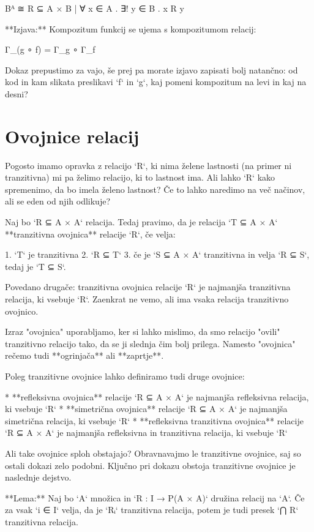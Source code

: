    Bᴬ ≅ { R ⊆ A × B | ∀ x ∈ A . ∃! y ∈ B . x R y }

**Izjava:** Kompozitum funkcij se ujema s kompozitumom relacij:

    Γ_(g ∘ f) = Γ_g ∘ Γ_f

Dokaz prepustimo za vajo, še prej pa morate izjavo zapisati bolj natančno: od
kod in kam slikata preslikavi `f` in `g`, kaj pomeni kompozitum na levi in kaj
na desni?

\section{Ovojnice relacij}

Pogosto imamo opravka z relacijo `R`, ki nima želene lastnosti (na primer ni
tranzitivna) mi pa želimo relacijo, ki to lastnost ima. Ali lahko `R` kako
spremenimo, da bo imela želeno lastnost? Če to lahko naredimo na več načinov,
ali se eden od njih odlikuje?

Naj bo `R ⊆ A × A` relacija. Tedaj pravimo, da je relacija `T ⊆ A × A`
**tranzitivna ovojnica** relacije `R`, če velja:

1. `T` je tranzitivna
2. `R ⊆ T`
3. če je `S ⊆ A × A` tranzitivna in velja `R ⊆ S`, tedaj je `T ⊆ S`.

Povedano drugače: tranzitivna ovojnica relacije `R` je najmanjša tranzitivna
relacija, ki vsebuje `R`. Zaenkrat ne vemo, ali ima vsaka relacija tranzitivno
ovojnico.

Izraz "ovojnica" uporabljamo, ker si lahko mislimo, da smo relacijo "ovili"
tranzitivno relacijo tako, da se ji slednja čim bolj prilega. Namesto "ovojnica"
rečemo tudi **ogrinjača** ali **zaprtje**.

Poleg tranzitivne ovojnice lahko definiramo tudi druge ovojnice:

* **refleksivna ovojnica** relacije `R ⊆ A × A` je najmanjša refleksivna relacija, ki vsebuje `R`
* **simetrična ovojnica** relacije `R ⊆ A × A` je najmanjša simetrična relacija, ki vsebuje `R`
* **refleksivna tranzitivna ovojnica** relacije `R ⊆ A × A` je najmanjša
  refleksivna in tranzitivna relacija, ki vsebuje `R`

Ali take ovojnice sploh obstajajo? Obravnavajmo le tranzitivne ovojnice, saj so
ostali dokazi zelo podobni. Ključno pri dokazu obstoja tranzitivne ovojnice je
naslednje dejstvo.

**Lema:** Naj bo `A` množica in `R : I → P(A × A)` družina relacij na `A`. Če za
vsak `i ∈ I` velja, da je `Rᵢ` tranzitivna relacija, potem je tudi presek `⋂ R`
tranzitivna relacija.

